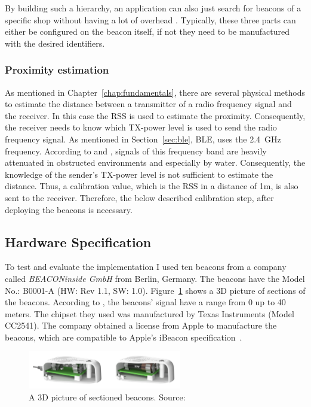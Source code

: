 \noindent By building such a hierarchy, an application can also just search for beacons of a specific shop without having a lot of overhead \citep{apple:getting_started,binside:ds}. Typically, these three parts can either be configured on the beacon itself, if not they need to be manufactured with the desired identifiers.

\subsubsection*{Proximity estimation}
As mentioned in Chapter~\ref{chap:fundamentals}, there are several physical methods to estimate the distance between a transmitter of a radio frequency signal and the receiver. In this case the \acf{RSS} is used to estimate the proximity. Consequently, the receiver needs to know which \acs{TX}-power level is used to send the radio frequency signal. As mentioned in Section~\ref{sec:ble}, \ac{BLE}, uses the 2.4~GHz frequency. According to \citet{apple:getting_started} and \citet{binside:ds}, signals of this frequency band are heavily attenuated in obstructed environments and especially by water. Consequently, the knowledge of the sender's \acs{TX}-power level is not sufficient to estimate the distance. Thus, a calibration value, which is the \acl{RSS} in a distance of 1m, is also sent to the receiver. Therefore, the below described calibration step, after deploying the beacons is necessary.

\subsection{Hardware Specification}
To test and evaluate the implementation I used ten beacons from a company called \emph{BEACONinside GmbH} from Berlin, Germany. The beacons have the Model No.: B0001-A (HW: Rev 1.1, SW: 1.0). Figure~\ref{fig:bi:beacons} shows a 3D picture of sections of the beacons. According to \citet{binside:ds}, the beacons' signal have a range from 0 up to 40 meters. The chipset they used was manufactured by Texas Instruments (Model CC2541). The company obtained a license from Apple to manufacture the beacons, which are compatible to Apple's iBeacon specification~\citep{binside:ds}.

\begin{figure}
	\includegraphics[width=0.6\textwidth]{figures/BEACONinside_beacons}
	\caption{A 3D picture of sectioned beacons. Source:~\citep{binside:ds}}
	\label{fig:bi:beacons}
\end{figure}

